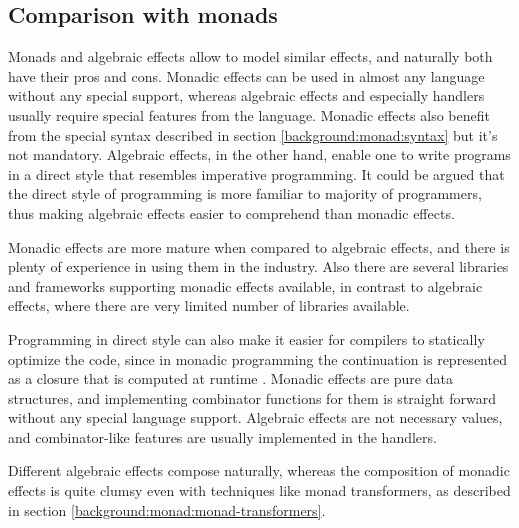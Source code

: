 \subsection{Comparison with monads}
Monads and algebraic effects allow to model similar effects, and naturally both have their pros and cons. Monadic effects can be used in almost any language without any special support, whereas algebraic effects and especially handlers usually require special features from the language. Monadic effects also benefit from the special syntax described in section \ref{background:monad:syntax} but it's not mandatory. Algebraic effects, in the other hand, enable one to write programs in a direct style that resembles imperative programming. It could be argued that the direct style of programming is more familiar to majority of programmers, thus making algebraic effects easier to comprehend than monadic effects.

Monadic effects are more mature when compared to algebraic effects, and there is plenty of experience in using them in the industry. Also there are several libraries and frameworks supporting monadic effects available, in contrast to algebraic effects, where there are very limited number of libraries available.

Programming in direct style can also make it easier for compilers to statically optimize the code, since in monadic programming the continuation is represented as a closure that is computed at runtime . Monadic effects are pure data structures, and implementing combinator functions for them is straight forward without any special language support. Algebraic effects are not necessary values, and combinator-like features are usually implemented in the handlers.

Different algebraic effects compose naturally, whereas the composition of monadic effects is quite clumsy even with techniques like monad transformers, as described in section \ref{background:monad:monad-transformers}. 

